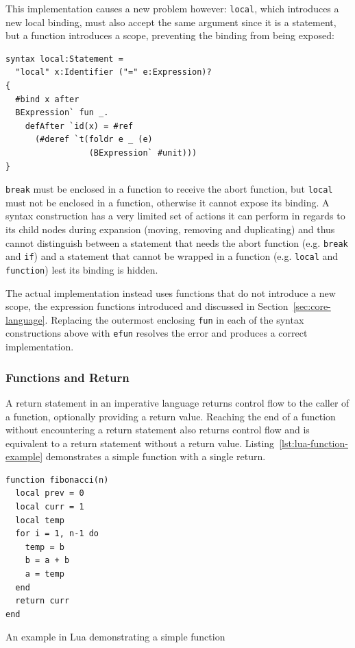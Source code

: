 \documentclass{kththesis}
\begin{document}
This implementation causes a new problem however: \texttt{local}, which introduces a new local binding, must also accept the same argument since it is a statement, but a function introduces a scope, preventing the binding from being exposed:

\begin{verbatim}
syntax local:Statement =
  "local" x:Identifier ("=" e:Expression)?
{
  #bind x after
  BExpression` fun _.
    defAfter `id(x) = #ref
      (#deref `t(foldr e _ (e)
                 (BExpression` #unit)))
}
\end{verbatim}

\texttt{break} must be enclosed in a function to receive the abort function, but \texttt{local} must not be enclosed in a function, otherwise it cannot expose its binding. A syntax construction has a very limited set of actions it can perform in regards to its child nodes during expansion (moving, removing and duplicating) and thus cannot distinguish between a statement that needs the abort function (e.g. \texttt{break} and \texttt{if}) and a statement that cannot be wrapped in a function (e.g. \texttt{local} and \texttt{function}) lest its binding is hidden.

The actual implementation instead uses functions that do not introduce a new scope, the expression functions introduced and discussed in Section~\ref{sec:core-language}. Replacing the outermost enclosing \texttt{fun} in each of the syntax constructions above with \texttt{efun} resolves the error and produces a correct implementation.

\subsubsection{Functions and Return}

A return statement in an imperative language returns control flow to the caller of a function, optionally providing a return value. Reaching the end of a function without encountering a return statement also returns control flow and is equivalent to a return statement without a return value. Listing~\ref{lst:lua-function-example} demonstrates a simple function with a single return.

\begin{listing}
\begin{verbatim}
function fibonacci(n)
  local prev = 0
  local curr = 1
  local temp
  for i = 1, n-1 do
    temp = b
    b = a + b
    a = temp
  end
  return curr
end
\end{verbatim}
\caption{An example in Lua demonstrating a simple function}
\label{lst:lua-function-example}
\end{listing}
\end{document}
